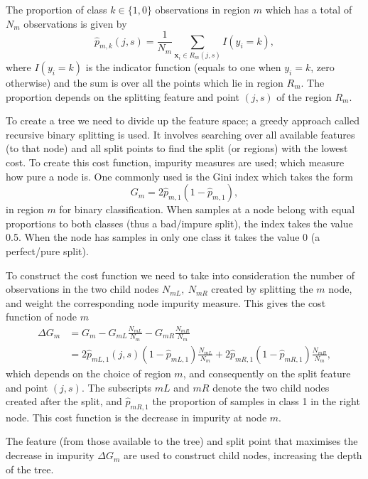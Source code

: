 The proportion of class $k \in \{1,0\}$ observations in region $m$ which has a total of $N_m$ observations is given by
\begin{equation}
	\hat{p}_{m,k}(j,s) = \frac{1}{N_m} \sum_{\mathbf{x}_i \in R_m(j,s)} I(y_i = k), 
\end{equation}
where $I(y_i=k)$ is the indicator function (equals to one when $y_i =k$, zero otherwise) and the sum is over all the points which lie in region $R_m$. The proportion depends on the splitting feature and point $(j,s)$ of the region $R_m$.


To create a tree we need to divide up the feature space; a greedy approach called recursive binary splitting is used. It involves searching over all available features (to that node) and all split points to find the split (or regions) with the lowest cost.  To create this cost function, impurity measures are used; which measure how pure a node is.
One commonly used is the Gini index which takes the form
\begin{equation}
	G_m = 2\hat{p}_{m,1}(1-\hat{p}_{m,1}),
\end{equation}
in region $m$ for binary classification. When samples at a node  belong  with equal proportions to both classes (thus a bad/impure split), the index takes the value 0.5. When the node has samples in only one class it takes the value 0 (a perfect/pure split).

To construct the cost function we need to take into consideration the number of observations in the two child nodes $N_{mL},\ N_{mR}$ created by splitting the $m$ node, and weight the corresponding node impurity measure. This gives the cost function of node $m$ 
\begin{align}
	\Delta G_m &=G_m - G_{mL} \frac{N_{mL}}{N_m} - G_{mR}\frac{N_{mR}}{N_m}\\ &=2\hat{p}_{mL,1}(j,s)(1-\hat{p}_{mL,1})\frac{N_{mL}}{N_m} + 2\hat{p}_{mR,1}(1-\hat{p}_{mR,1})\frac{N_{mR}}{N_m},
	\label{eq:decreaseimpurity}
\end{align}
which depends on the choice of region $m$, and consequently on the split feature and point $(j,s)$. The subscripts $mL$ and $mR$ denote the two child nodes created after the split, and $\hat{p}_{mR,1}$ the proportion of samples in class 1 in the right node. This cost function is the decrease in impurity at node $m$.

The feature (from those available to the tree) and split point that maximises the decrease in impurity $\Delta G_m$ are used to construct child nodes, increasing the depth of the tree.

